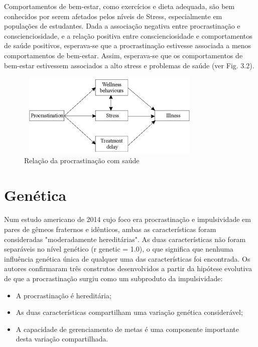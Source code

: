 \documentclass{report}
\begin{document}
Comportamentos de bem-estar, como exercícios e dieta adequada, são bem conhecidos por serem afetados pelos níveis de Stress, especialmente em populações de estudantes. Dada a associação negativa entre procrastinação e conscienciosidade, e a relação positiva entre conscienciosidade e comportamentos de saúde positivos, esperava-se que a procrastinação estivesse associada a menos comportamentos de bem-estar. Assim, esperava-se que os comportamentos de bem-estar estivessem associados a alto stress e problemas de saúde (ver Fig. 3.2).

\vspace{90mm}
\begin{figure}[h]
\center
\includegraphics[width=9cm, height=4cm]{uwu.png}
\caption{Relação da procrastinação com saúde}
\end{figure}



\section{Genética}
\label{chap.genética}
\paragraph{}

Num estudo americano de 2014 cujo foco era procrastinação e impulsividade em pares de gêmeos fraternos e idênticos, ambas as características foram consideradas "moderadamente hereditárias". As duas características não
foram separáveis no nível genético (r {\tiny genetic} = 1.0), o que significa que nenhuma influência genética única de qualquer uma das características foi encontrada. Os autores confirmaram três construtos desenvolvidos a partir da hipótese evolutiva de que a procrastinação surgiu como um subproduto da impulsividade: 
\begin{itemize}
  \item A procrastinação é hereditária;
  \item As duas características compartilham uma variação genética considerável;
  \item A capacidade de gerenciamento de metas é uma componente importante desta variação compartilhada.
\end{itemize}
\end{document}
